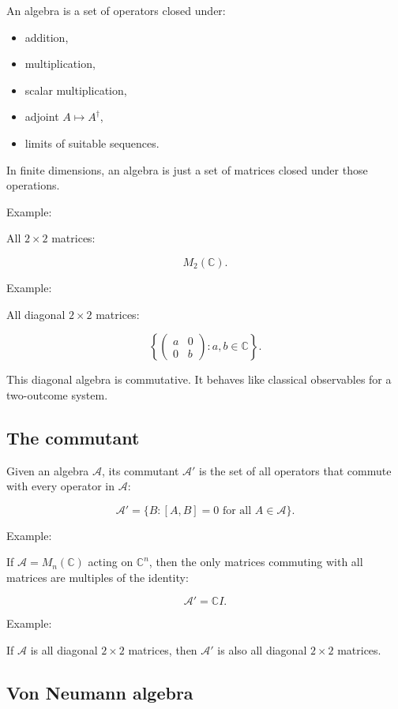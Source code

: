 \documentclass[11pt,a4paper]{article}
\begin{document}
An algebra is a set of operators closed under:

\begin{itemize}
  \item addition,
  \item multiplication,
  \item scalar multiplication,
  \item adjoint $A\mapsto A^\dagger$,
  \item limits of suitable sequences.
\end{itemize}

In finite dimensions, an algebra is just a set of matrices closed under those operations.

Example:

All $2\times 2$ matrices:

\[
M_2(\mathbb{C}).
\]

Example:

All diagonal $2\times 2$ matrices:

\[
\left\{
\begin{pmatrix}
a & 0\\
0 & b
\end{pmatrix}
: a,b\in\mathbb{C}
\right\}.
\]

This diagonal algebra is commutative. It behaves like classical observables for a two-outcome system.

\subsection{The commutant}

Given an algebra $\mathcal{A}$, its commutant $\mathcal{A}'$ is the set of all operators that commute with every operator in $\mathcal{A}$:

\[
\mathcal{A}'=\{B:[A,B]=0\text{ for all }A\in\mathcal{A}\}.
\]

Example:

If $\mathcal{A}=M_n(\mathbb{C})$ acting on $\mathbb{C}^n$, then the only matrices commuting with all matrices are multiples of the identity:

\[
\mathcal{A}'=\mathbb{C}I.
\]

Example:

If $\mathcal{A}$ is all diagonal $2\times 2$ matrices, then $\mathcal{A}'$ is also all diagonal $2\times 2$ matrices.

\subsection{Von Neumann algebra}
\end{document}
